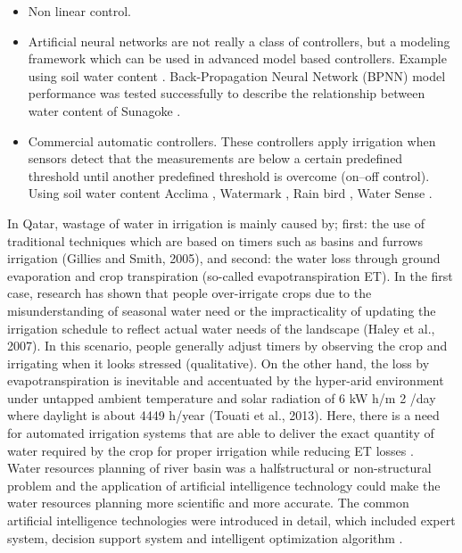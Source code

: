 \documentclass[letterpaper, 10 pt, conference]{ieeeconf}  %
\begin{document}
\begin{itemize}
\item Non linear control.
\item Artificial neural networks are not really a class of controllers, but a modeling framework which can be used in advanced model based controllers. Example using soil water content \cite{capraro2008neural}. Back-Propagation Neural Network (BPNN) model performance was tested successfully to describe the relationship between water content of Sunagoke  \cite{Hendrawan2011}.
\item Commercial automatic controllers. These controllers apply irrigation when sensors detect that the measurements are below a certain predefined threshold until another predefined threshold is overcome (on–off control). Using soil water content Acclima \cite{Acclima2017}, Watermark \cite{Watermark2017}, Rain bird \cite{RainBird2017}, Water Sense \cite{WaterSense2017}.
\end{itemize}

In Qatar, wastage of water in irrigation is mainly caused by; ﬁrst: the use of traditional techniques which are based on timers such as basins and furrows irrigation (Gillies and Smith, 2005), and second: the water loss through ground evaporation and crop transpiration (so-called evapotranspiration ET). In the ﬁrst case, research has shown that people over-irrigate crops due to the misunderstanding of seasonal water need or the impracticality of updating the irrigation schedule to reﬂect actual water needs of the landscape (Haley et al., 2007). In this scenario, people generally adjust timers by observing the crop and irrigating when it looks stressed (qualitative). On the other hand, the loss by evapotranspiration is inevitable and accentuated by the hyper-arid environment under untapped ambient temperature and solar radiation of 6 kW h/m 2 /day where daylight is about 4449 h/year (Touati et al., 2013). Here, there is a need for automated irrigation systems that are able to deliver the exact quantity of water required by the crop for proper irrigation while reducing ET losses \cite{Touati2013}. \\


Water resources planning of river basin was a halfstructural or non-structural problem and the application of artificial intelligence technology could make the water resources planning more scientific and more accurate. The common artificial intelligence technologies were introduced in detail, which included expert system, decision support system and intelligent optimization algorithm \cite{chen2010application}.
\end{document}
